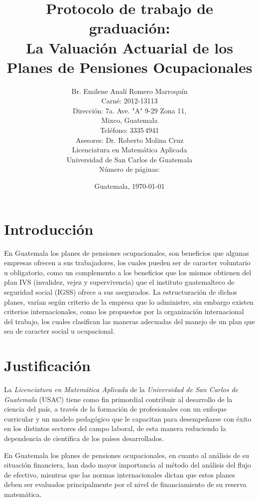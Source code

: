 \documentclass[12pt,letterpaper,titlepage]{article}
\title{Protocolo de trabajo de graduación:\\
La Valuación Actuarial de los Planes de Pensiones Ocupacionales}
\author{Br. Emilene Analí Romero Marroquín\\Carné: 2012-13113\\Dirección: 7a. Ave. "A" 9-29 Zona 11,\\Mixco, Guatemala\\Teléfono: 3335\,4941\\Asesores: Dr. Roberto Molina Cruz\\Licenciatura en Matemática Aplicada\\Universidad de San Carlos de Guatemala\\Número de páginas: \pageref{fin}}
\date{Guatemala, \today}
\begin{document}
\begin{titlepage}
\renewcommand{\thepage}{}
\pagestyle{empty}
\maketitle
\end{titlepage}\newpage
\setcounter{page}{2}
\tableofcontents
\newpage
\nocite{*}
\section{Introducción}

En Guatemala los planes de pensiones ocupacionales, son beneficios que algunas empresas ofrecen a sus trabajadores, los cuales pueden ser de caracter voluntario u obligatorio, como un complemento a los beneficios que los mismos obtienen del plan IVS (invalidez, vejez y supervivencia) que el instituto guatemalteco de seguridad social (IGSS) ofrece a sus asegurados. La estructuración de dichos planes, varían según criterio de la empresa que lo administre, sin embargo existen criterios internacionales, como los propuestos por la organización internacional del trabajo, los cuales clasifican las maneras adecuadas del manejo de un plan que sea de caracter social u ocupacional.



\newpage

\section{Justificación}

La \textit{Licenciatura en Matemática Aplicada} de la \textit{Universidad de San Carlos de Guatemala} (USAC) tiene como fin primordial contribuir al desarrollo de la ciencia del país, a través de la formación de profesionales con un enfoque curricular y un modelo pedagógico que le capacitan para desempeñarse con éxito en los distintos sectores del campo laboral, de esta manera reduciendo la dependencia de científica de los países desarrollados.\bigskip

En Guatemala los planes de pensiones ocupacionales, en cuanto al análisis de su situación financiera, han dado mayor importancia al método del análisis del flujo de efectivo, mientras que las normas internacionales dictan que estos planes deben ser evaluados principalmente por el nivel de financiamiento de su reserva matemática.  \bigskip
\end{document}
